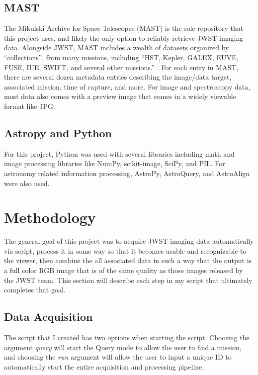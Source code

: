 \documentclass[10pt,twocolumn,letterpaper]{article}
\begin{document}
\subsection{MAST}

The Mikulski Archive for Space Telescopes (MAST) is the sole repository that this project uses, and likely the only option to reliably retrieve JWST imaging data. Alongside JWST, MAST includes a wealth of datasets organized by ``collections'', from many missions, including ``HST, Kepler, GALEX, EUVE, FUSE, IUE, SWIFT, and several other missions.'' \cite{mast}.
For each entry in MAST, there are several dozen metadata entries describing the image/data target, associated mission, time of capture, and more. For image and spectroscopy data, most data also comes with a preview image that comes in a widely viewable format like JPG.

\subsection{Astropy and Python}
For this project, Python was used with several libraries including math and image processing libraries like NumPy, scikit-image, SciPy, and PIL. For astronomy related information processing, AstroPy, AstroQuery, and AstroAlign were also used.

\section{Methodology}
\label{sec:script}
The general goal of this project was to acquire JWST imaging data automatically via script, process it in some way so that it becomes usable and recognizable to the viewer, then combine the all associated data in such a way that the output is a full color RGB image that is of the same quality as those images released by the JWST team. This section will describe each step in my script that ultimately completes that goal.

\subsection{Data Acquisition}
The script that I created has two options when starting the script. Choosing the argument \emph{query} will start the Query mode to allow the user to find a mission, and choosing the \emph{run} argument will allow the user to input a unique ID to automatically start the entire acquisition and processing pipeline.
\newline
\end{document}
